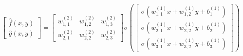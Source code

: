 \documentclass[preview]{standalone}
\begin{document}
\begin{align*}
\begin{bmatrix} \hat{f}(x,y) \\ \hat{g}(x,y) \end{bmatrix} = \begin{bmatrix} w_{1,1}^{(2)} & w_{1,2}^{(2)} & w_{1,3}^{(2)} \\ w_{2,1}^{(2)} & w_{2,2}^{(2)} & w_{2,3}^{(2)} \end{bmatrix} \sigma\left(\begin{bmatrix} \sigma(w_{1,1}^{(1)}x + w_{1,2}^{(1)}y +b_1^{(1)}) \\ \sigma(w_{2,1}^{(1)}x + w_{2,2}^{(1)}y +b_2^{(1)}) \\ \sigma(w_{3,1}^{(1)}x + w_{3,2}^{(1)}y +b_3^{(1)}) \end{bmatrix}\right)
\end{align*}
\end{document}
